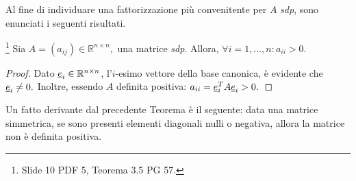 Al fine di individuare una fattorizzazione più convenitente per $A$ \textit{sdp}, sono enunciati i seguenti risultati.

\begin{theorem}\label{th:elDiagPosMatrSDP}\footnote{Slide 10 PDF 5, Teorema 3.5 PG 57.}
    Sia $A=(a_{ij})\in\mathbb R^{n\times n},$ una matrice \textit{sdp}. Allora, $\forall i=1,\hdots,n: a_{ii}>0.$
\end{theorem}
\begin{proof}
    Dato $\uline e_i\in\mathbb R^{n\times n}$, l'$i$-esimo vettore della base canonica, è evidente che $\uline e_i\neq 0.$ Inoltre, essendo $A$ definita positiva: $a_{ii}=\uline e_i^T A \uline e_i>0.$
\end{proof}

Un fatto derivante dal precedente Teorema è il seguente: data una matrice simmetrica, se sono presenti elementi diagonali nulli o negativa, allora la matrice non è definita positiva. 

